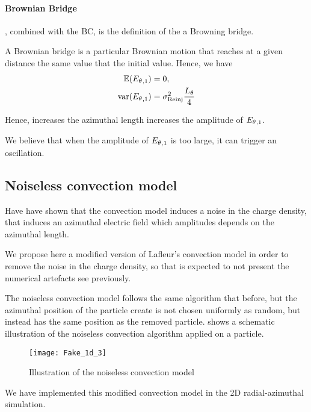     \paragraph{Brownian Bridge}
      , combined with the \ac{BC}, is the definition of the a Browning bridge.
      
      A Brownian bridge is a particular Brownian motion that reaches at a given distance the same value that the initial value.
      Hence, we have
      \begin{align*}
        \mathbb{E}({E_{\theta}}_{, 1}) &= 0,  \\
        {\rm var}({E_{\theta}}_{, 1}) &= \sigma_{\rm Reinj}^2 \frac{L_{\theta}}{4}
      \end{align*}
    
      Hence, increases the azimuthal length increases the amplitude of ${E_{\theta}}_{, 1}$.
      
    
    We believe that when the amplitude of ${E_{\theta}}_{, 1}$ is too large, it can trigger an oscillation.
    
    \subsection{Noiseless convection model}
      \label{sec-noiselessresults}
      Have have shown that the convection model induces a noise in the charge density, that induces an azimuthal electric field which amplitudes depends on the azimuthal length.
      
      We propose here a modified version of Lafleur's convection model in order to remove the noise in the charge density, so that is expected to not present the numerical artefacts see previously.
      
      The noiseless convection model follows the same algorithm that before, but the azimuthal position of the particle create is not chosen uniformly as random, but instead has the same position as the removed particle.
       shows a schematic illustration of the noiseless convection algorithm applied on a particle.
      
      \begin{figure}[hbtp]
        \centering
        \texttt{[image: Fake\_1d\_3]}
        \caption{Illustration of the noiseless convection model}
        \label{fig-fakez3}
      \end{figure}
      
      We have implemented this modified convection model in the \ac{2D} radial-azimuthal simulation.
      

